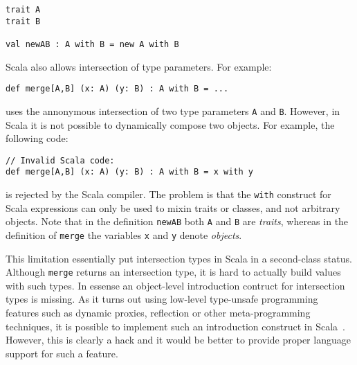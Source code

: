 \begin{lstlisting}
trait A
trait B

val newAB : A with B = new A with B
\end{lstlisting}

\noindent Scala also allows intersection of type parameters. For example:
\begin{lstlisting}
def merge[A,B] (x: A) (y: B) : A with B = ...
\end{lstlisting}
uses the annonymous intersection of two type parameters \lstinline{A} and
\lstinline{B}. However, in Scala it is not possible to dynamically
compose two objects. For example, the following code:

\begin{lstlisting}
// Invalid Scala code:
def merge[A,B] (x: A) (y: B) : A with B = x with y
\end{lstlisting}

\noindent is rejected by the Scala compiler. The problem is that the
\lstinline{with} construct for Scala expressions can only be used to
mixin traits or classes, and not arbitrary objects. Note that in the 
definition \lstinline{newAB} both \lstinline{A} and \lstinline{B} are
\emph{traits}, whereas in the definition of \lstinline{merge} the variables 
\lstinline{x} and \lstinline{y} denote \emph{objects}. 

\begin{comment}
A common limitation in those languages, though, is that there is no introduction
construct at the term level for intersection types. In Java and Scala, we cannot
create an instance of class type \lstinline{A & B} with
\begin{lstlisting}
  new A() & B()
\end{lstlisting}
\end{comment}

This limitation essentially put intersection types in Scala in a second-class
status. Although \lstinline{merge} returns an intersection type, it is
hard to actually build values with such types. In essense an
object-level introduction contruct for intersection types is missing.
As it turns out using low-level type-unsafe programming features such
as dynamic proxies, reflection or other meta-programming techniques,
it is possible to implement such an introduction
construct in Scala~\cite{oliveira2013feature,rendel14attributes}. However, this
is clearly a hack and it would be better to provide proper language
support for such a feature.

\begin{comment}
This is in 
contrast, there are term-level introduction construct for function types (with
lambdas) and universal quantification (with big lambdas) in most core
calculi.
\end{comment}

